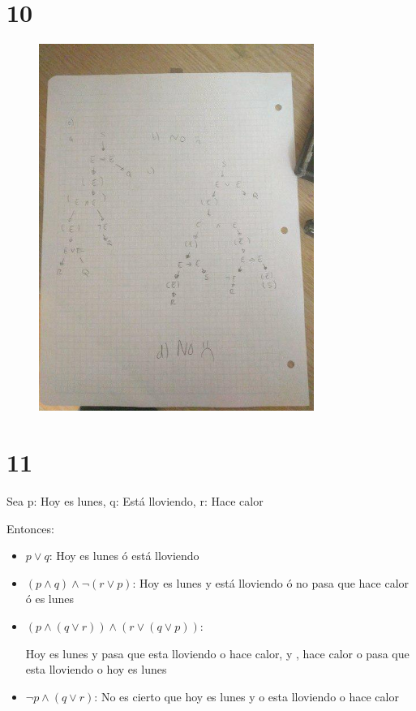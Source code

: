 \documentclass[12pt, fleqn]{article}                            %
\theoremstyle{break}                                            %
\begin{document}
\section{10}
\begin{figure}[h]
    \centering
    \includegraphics[width=0.8\textwidth]{10}
\end{figure}


\clearpage
\section{11}

    Sea p: Hoy es lunes, q: Está lloviendo, r: Hace calor

    Entonces:
    \begin{itemize}
        \item $p \vee q$: Hoy es lunes ó está lloviendo
        \item $(p \wedge q) \wedge \neg(r \vee p)$: Hoy es lunes y está lloviendo ó no pasa que
        hace calor ó es lunes
        \item $(p \wedge (q \vee r)) \wedge (r \vee (q \vee p))$: 

        Hoy es lunes y pasa que esta lloviendo o hace calor, y , hace calor o pasa que esta lloviendo
        o hoy es lunes
        \item $\neg p \wedge (q \vee r)$: No es cierto que hoy es lunes y o esta lloviendo o hace calor   
    \end{itemize}
\end{document}
